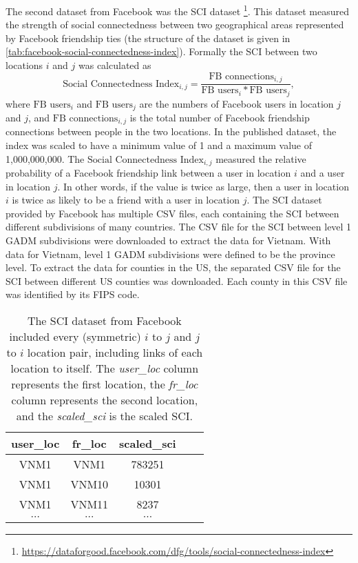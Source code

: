 The second dataset from Facebook was the \gls{SCI} dataset \footnote{\url{https://dataforgood.facebook.com/dfg/tools/social-connectedness-index}}.
This dataset measured the strength of social connectedness between two geographical areas represented by Facebook friendship ties (the structure of the dataset is given in \autoref{tab:facebook-social-connectedness-index}).
Formally the \gls{SCI} between two locations $i$ and $j$ was calculated as
\begin{equation}
    \text{Social Connectedness Index}_{i,j} = \frac{\text{FB connections}_{i,j}}{\text{FB users}_i * \text{FB users}_j},
\end{equation}
where $\text{FB users}_i$ and $\text{FB users}_j$ are the numbers of Facebook users in location $j$ and $j$, and $\text{FB connections}_{i,j}$ is the total number of Facebook friendship connections between people in the two locations.
In the published dataset, the index was scaled to have a minimum value of 1 and a maximum value of 1,000,000,000.
The $\text{Social Connectedness Index}_{i,j}$ measured the relative probability of a Facebook friendship link between a user in location $i$ and a user in location $j$.
In other words, if the value is twice as large, then a user in location $i$ is twice as likely to be a friend with a user in location $j$.
The \gls{SCI} dataset provided by Facebook has multiple \gls{CSV} files, each containing the \gls{SCI} between different subdivisions of many countries.
The \gls{CSV} file for the \gls{SCI} between level 1 \gls{GADM} subdivisions were downloaded to extract the data for Vietnam.
With data for Vietnam, level 1 \gls{GADM} subdivisions were defined to be the province level.
To extract the data for counties in the \gls{US}, the separated \gls{CSV} file for the \gls{SCI} between different \gls{US} counties was downloaded.
Each county in this \gls{CSV} file was identified by its \gls{FIPS} code.

\begin{table}[h]
\centering
\begin{tabular}{| c | c | c | c | c |}
    user\_loc & fr\_loc & scaled\_sci \\
    \hline\hline
    VNM1 & VNM1 & 783251 \\
    \hline
    VNM1 & VNM10 & 10301 \\
    \hline
    VNM1 & VNM11 & 8237 \\
    \hline
    $\cdots$ & $\cdots$ & $\cdots$ \\
\end{tabular}
\caption[Facebook SCI dataset structure]{The SCI dataset from Facebook included every (symmetric) $i$ to $j$ and $j$ to $i$ location pair, including links of each location to itself. The \textit{user\_loc} column represents the first location, the \textit{fr\_loc} column represents the second location, and the \textit{scaled\_sci} is the scaled SCI.}
\label{tab:facebook-social-connectedness-index}
\end{table}

